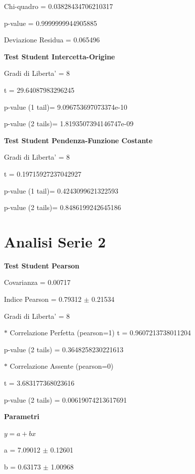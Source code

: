 \documentclass{article}
\begin{document}
Chi-quadro = 0.03828434706210317

p-value = 0.9999999944905885

Deviazione Residua = 0.065496

\textbf{Test Student Intercetta-Origine}

Gradi di Liberta' = 8

t = 29.64087983296245

p-value (1 tail)= 9.096753697073374e-10

p-value (2 tails)= 1.8193507394146747e-09

\textbf{Test Student Pendenza-Funzione Costante}

Gradi di Liberta' = 8

t = 0.19715927237042927

p-value (1 tail)= 0.4243099621322593

p-value (2 tails)= 0.8486199242645186

\section*{Analisi Serie 2}

\textbf{Test Student Pearson}

Covarianza = 0.00717

Indice Pearson = 0.79312 $\pm$ 0.21534

Gradi di Liberta' = 8

$\ast$ Correlazione Perfetta (pearson=1)
t = 0.9607213738011204

p-value (2 tails) = 0.3648258230221613

$\ast$ Correlazione Assente (pearson=0)

t = 3.683177368023616

p-value (2 tails) = 0.00619074213617691

\textbf{Parametri}

$y = a + bx$

a = 7.09012 $\pm$ 0.12601

b = 0.63173 $\pm$ 1.00968
\end{document}
